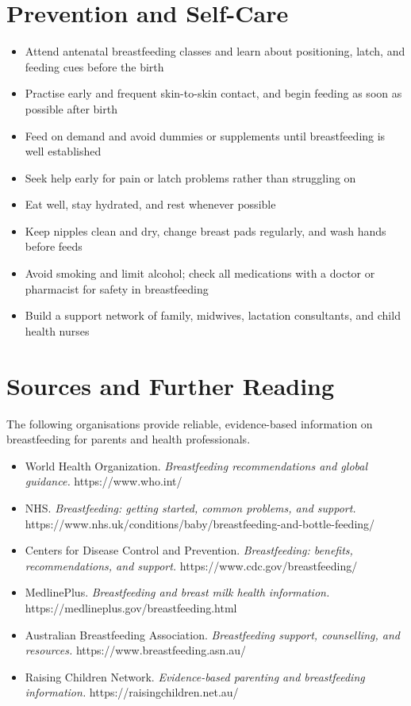 \section*{Prevention and Self-Care}
\begin{itemize}
    \item Attend antenatal breastfeeding classes and learn about positioning, latch, and feeding cues before the birth
    \item Practise early and frequent skin-to-skin contact, and begin feeding as soon as possible after birth
    \item Feed on demand and avoid dummies or supplements until breastfeeding is well established
    \item Seek help early for pain or latch problems rather than struggling on
    \item Eat well, stay hydrated, and rest whenever possible
    \item Keep nipples clean and dry, change breast pads regularly, and wash hands before feeds
    \item Avoid smoking and limit alcohol; check all medications with a doctor or pharmacist for safety in breastfeeding
    \item Build a support network of family, midwives, lactation consultants, and child health nurses
\end{itemize}

\section*{Sources and Further Reading}
The following organisations provide reliable, evidence-based information on breastfeeding for parents and health professionals.

\begin{itemize}
    \item World Health Organization. \textit{Breastfeeding recommendations and global guidance.} https://www.who.int/
    \item NHS. \textit{Breastfeeding: getting started, common problems, and support.} https://www.nhs.uk/conditions/baby/breastfeeding-and-bottle-feeding/
    \item Centers for Disease Control and Prevention. \textit{Breastfeeding: benefits, recommendations, and support.} https://www.cdc.gov/breastfeeding/
    \item MedlinePlus. \textit{Breastfeeding and breast milk health information.} https://medlineplus.gov/breastfeeding.html
    \item Australian Breastfeeding Association. \textit{Breastfeeding support, counselling, and resources.} https://www.breastfeeding.asn.au/
    \item Raising Children Network. \textit{Evidence-based parenting and breastfeeding information.} https://raisingchildren.net.au/
\end{itemize}
